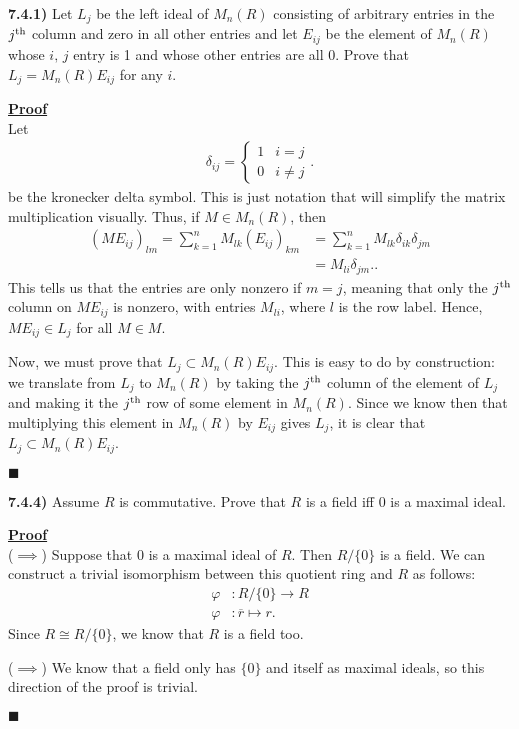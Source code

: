 \documentclass[12pt,a4paper]{article}
\newcommand{\prob}[2]{\textbf{#1)} #2}
\newenvironment{proof}
{
\textbf{\underline{Proof}} \\
}
{
\begin{flushright}
$\blacksquare$
\end{flushright}}
\begin{document}
\prob{7.4.1}{
    Let $L_{j}$ be the left ideal of $M_{n}(R)$ consisting of arbitrary entries in the $j^{\rm th}$ column and zero in all other entries and let $E_{ij}$ be the element of $M_{n}(R)$ whose $i,\,j$ entry is 1 and whose other entries are all 0.
Prove that $L_{j} = M_{n}(R)E_{ij}$ for any $i$.
}

\begin{proof}
    Let 
    \begin{align*}
        \delta_{ij} = \begin{cases}
            1 & i = j \\
            0 & i \ne j
        \end{cases}
    .\end{align*}
    be the kronecker delta symbol.
    This is just notation that will simplify the matrix multiplication visually.
    Thus, if $M \in M_{n}(R)$, then 
    \begin{align*}
        (ME_{ij})_{lm} = \sum_{k=1}^{n} M_{lk}(E_{ij})_{km} &= \sum_{k=1}^{n} M_{lk}\delta_{ik}\delta_{jm} \\
        &= M_{li}\delta_{jm}.
    .\end{align*}
    This tells us that the entries are only nonzero if $m = j$, meaning that only the $j^{\rm th}$ column on $ME_{ij}$ is nonzero, with entries $M_{li}$, where $l$ is the row label.
    Hence, $ME_{ij} \in L_{j}$ for all $M \in M$.

    Now, we must prove that $L_{j} \subset M_{n}(R)E_{ij}$.
    This is easy to do by construction: we translate from $L_{j}$ to $M_{n}(R)$ by taking the $j^{\rm th}$ column of the element of $L_{j}$ and making it the $j^{\rm th}$ row of some element in $M_{n}(R)$.
    Since we know then that multiplying this element in $M_{n}(R)$ by $E_{ij}$ gives $L_{j}$, it is clear that $L_{j} \subset M_{n}(R)E_{ij}$.
\end{proof}

\prob{7.4.4}{
Assume $R$ is commutative.
Prove that $R$ is a field iff 0 is a maximal ideal.
}

\begin{proof}
    ($\implies$) Suppose that $0$ is a maximal ideal of $R$.
    Then $R/\{ 0 \}$ is a field.
    We can construct a trivial isomorphism between this quotient ring and $R$ as follows:
    \begin{align*}
        \varphi&: R / \{ 0 \} \to R \\
        \varphi&: \overline{r} \mapsto r
    .\end{align*}
    Since $R \cong R / \{ 0 \} $, we know that $R$ is a field too.

    ($\implies$) We know that a field only has $\{ 0 \} $ and itself as maximal ideals, so this direction of the proof is trivial.
\end{proof}
\end{document}
